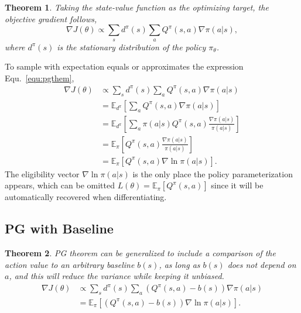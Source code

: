 \documentclass{article} %
\newtheorem{theorem}{Theorem}
\begin{document}
\begin{theorem}\label{them:PG}
Taking the state-value function as the optimizing target, the objective gradient follows,
\begin{equation} \label{equ:pgthem}
    \nabla J(\theta) \propto \sum_s d^\pi(s) \sum_a Q^\pi(s,a) \nabla \pi(a|s),
\end{equation}
where $d^\pi(s)$ is the stationary distribution of the policy $\pi_{\theta}$.
\end{theorem}
To sample with expectation equals or approximates the expression Equ.~\ref{equ:pgthem},
\begin{equation} \label{equ:pgtheorem-sample}
    \begin{aligned}
        \nabla J(\theta) &\propto \sum_s d^\pi(s)\sum_a Q^\pi (s,a) \nabla\pi(a|s) \\
        &= \mathbb{E}_{d^\pi}\left[\sum_a Q^\pi (s,a) \nabla\pi(a|s) \right] \\
        &= \mathbb{E}_{d^\pi}\left[\sum_a \pi(a|s) Q^\pi (s,a) \frac{\nabla\pi(a|s)}{\pi(a|s)} \right] \\
        &= \mathbb{E}_{\pi}\left[Q^\pi (s,a) \frac{\nabla\pi(a|s)}{\pi(a|s)} \right] \\
        &= \mathbb{E}_{\pi}\left[Q^\pi (s,a) \nabla\ln\pi(a|s) \right].
    \end{aligned}
\end{equation}
The eligibility vector $\nabla\ln\pi(a|s)$ is the only place the policy parameterization appears, which can be omitted $L(\theta)=\mathbb{E}_{\pi}[Q^\pi(s,a)]$ since it will be automatically recovered when differentiating.

\subsection{PG with Baseline}

\begin{theorem} \label{them:PG-baseline}
    PG theorem can be generalized to include a comparison of the action value to an arbitrary baseline $b(s)$, as long as $b(s)$ does not depend on $a$, and this will reduce the variance while keeping it unbiased.
    \begin{equation} \label{equ:reinforce-baseline}
    \begin{aligned}
        \nabla J(\theta) &\propto \sum_s d^\pi(s)\sum_a (Q^\pi (s,a) -b(s)) \nabla\pi(a|s) \\
        &= \mathbb{E}_{\pi} \left[(Q^\pi(s,a) -b(s)) \nabla\ln\pi(a|s)\right].
    \end{aligned}
\end{equation}
\end{theorem}
\end{document}
